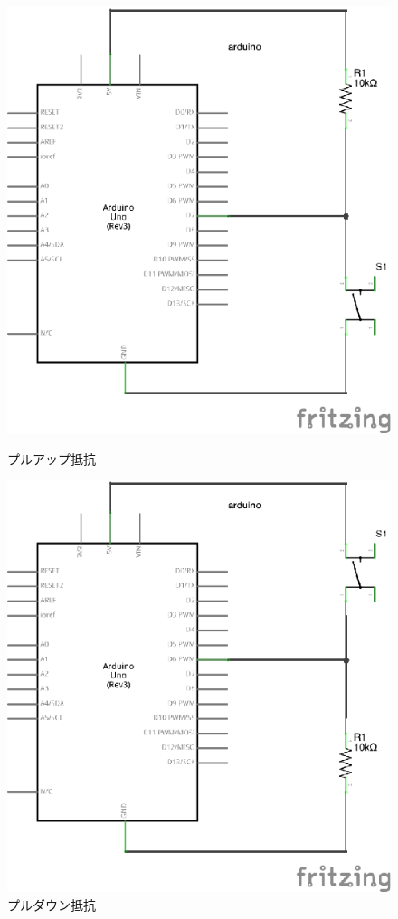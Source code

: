 \documentclass[11pt,a4paper]{jarticle}
\begin{document}
\begin{figure}[h]
 \begin{minipage}{0.5\columnwidth}
  \centering
  \includegraphics[width=0.8\columnwidth]{img/pullup.eps}
  \caption{プルアップ抵抗}
 \end{minipage}
 \begin{minipage}{0.5\columnwidth}
  \centering
  \includegraphics[width=0.8\columnwidth]{img/pulldown.eps}
  \caption{プルダウン抵抗}
 \end{minipage}
\end{figure}
\end{document}
